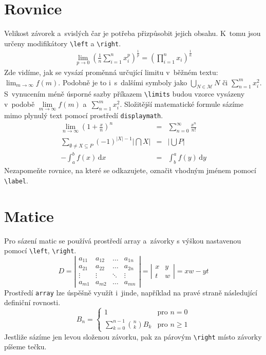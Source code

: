\documentclass[twocolumn, a4paper, 11pt]{article}
\begin{document}
\section{Rovnice} \label{equations}
Velikost závorek a~svislých čar je potřeba přizpůsobit jejich obsahu.
K~tomu jsou určeny modifikátory \verb|\left| a \verb|\right|.
\begin{eqnarray}
    \lim_{p\to0} \left( \frac{1}{n} \sum\limits _{i=1}^n x_i^p \right)^\frac{1}{p} = \left( \prod\limits _{i=1}^n x_i\right)^\frac{1}{n}
\end{eqnarray}
Zde vidíme, jak se vysází proměnná určující limitu v~běžném textu: $\lim_{m\to\infty} f(m)$.
Podobně je to i~s~dalšími symboly jako ${\bigcup_{N \in \mathcal{M}} N}$ či $\sum_{n=1}^{m} x^2_i$.
S~vynucením méně úsporné sazby příkazem \verb|\limits| budou vzorce vysázeny v~podobě $\lim\limits_{m\to\infty} f(m)$ a~$\sum\limits_{n=1}^{m} x^2_i$.
Složitější matematické formule sázíme mimo plynulý text pomocí prostředí \texttt{displaymath}.
\begin{eqnarray}
    {\lim\limits_{n\to\infty}\left(1+\frac{x}{n}\right)^n} & = & \sum\limits_{n=0}^{\infty}\frac{x^n}{n!}\\
    \sum\limits_{\emptyset\neq X\subseteq P}(-1)^{|X|-1}\left|\bigcap X\right| & = & \left|\bigcup P\right|\\
    -{\int_{a}^{b} f(x) \,\mathrm{d}x} & = & \int_{b}^{a} f(y) \,\mathrm{d}y \label{integrals}
\end{eqnarray}
Nezapomeňte rovnice, na které se odkazujete, označit vhodným jménem pomocí \verb|\label|.
\section{Matice} \label{matrixes}
Pro sázení matic se používá prostředí array a~závorky s výškou nastavenou pomocí
\verb|\left|, \verb|\right|.
\[
D = 
\left| 
\begin{array}{cccc}
    a_{11} & a_{12} & \dots & a_{1n} \\
    a_{21} & a_{22} & \dots & a_{2n} \\
    \vdots & \vdots & \ddots & \vdots \\
    a_{m1} & a_{m2} & \dots & a_{mn}
\end{array} 
\right|
=
\left| 
\begin{array}{cc}
    x & y \\
    t & w
\end{array} 
\right|
= xw - yt
\]
Prostředí \verb|array| lze úspěšně využít i~jinde,
například na pravé straně následující definiční rovnosti.
\[
B_{n} = 
\left\{
\begin{array}{ll}
    1 & \text{pro } n = 0 \\
    \sum\limits_{k=0}^{n-1} \binom{n}{k} B_{k} & \text{pro } n \geq 1
\end{array}
\right.
\]
Jestliže sázíme jen levou složenou závorku, pak za párovým \verb|\right|
místo závorky píšeme tečku.
\end{document}
